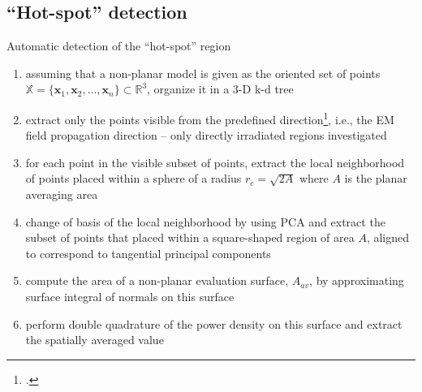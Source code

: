 \documentclass[xcolor=dvipsnames,10pt]{beamer}
\begin{document}
\subsection{``Hot-spot'' detection}
\begin{frame}{Automatic detection of the ``hot-spot'' region}
    \begin{enumerate}
        \item assuming that a non-planar model is given as the oriented set of points $\mathbb{X} = \{ \boldsymbol{x}_1, \boldsymbol{x}_2, \dots, \boldsymbol{x}_n \} \subset \mathbb{R}^3$, organize it in a 3-D k-d tree
        \item extract only the points visible from the predefined direction\footcite{Katz2007}, i.e., the EM field propagation direction -- only directly irradiated regions investigated
        \item for each point in the visible subset of points, extract the local neighborhood of points placed within a sphere of a radius $r_{c} = \sqrt{2 A}$ where $A$ is the planar averaging area
        \item change of basis of the local neighborhood by using PCA and extract the subset of points that placed within a square-shaped region of area $A$, aligned to correspond to tangential principal components
        \item compute the area of a non-planar evaluation surface, $A_{av}$, by approximating surface integral of normals on this surface
        \item perform double quadrature of the power density on this surface and extract the spatially averaged value
        \end{enumerate}
\end{frame}
\end{document}
